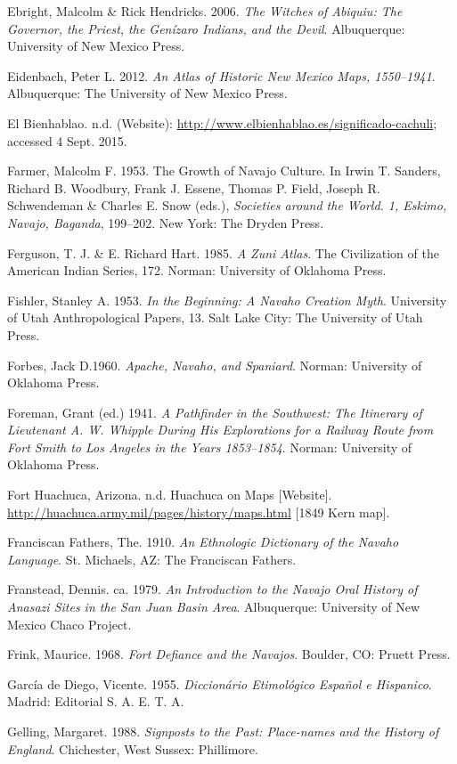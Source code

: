 Ebright, Malcolm \& Rick Hendricks. 2006. \textit{The Witches of Abiquiu: The Governor, the Priest, the Genízaro Indians, and the Devil}.  Albuquerque:  University of New Mexico Press.

Eidenbach, Peter L.  2012.  \textit{An Atlas of Historic New Mexico Maps, 1550--1941}.  Albuquerque:  The University of New Mexico Press.

El Bienhablao. n.d.  (Website): \url{http://www.elbienhablao.es/significado-cachuli}; accessed 4 Sept. 2015.

Farmer, Malcolm F.  1953.  The Growth of Navajo Culture.  In  Irwin T. Sanders, Richard B. Woodbury, Frank J. Essene, Thomas P. Field, Joseph R. Schwendeman \& Charles E. Snow (eds.), \textit{Societies around the World.  1, Eskimo, Navajo, Baganda},   199--202.  New York:  The Dryden Press.

Ferguson, T. J. \& E. Richard Hart. 1985. \textit{A Zuni Atlas}.  The Civilization of the American Indian Series, 172.  Norman:  University of Oklahoma Press.

Fishler, Stanley A.  1953. \textit{In the Beginning: A Navaho Creation Myth}.  University of Utah Anthropological Papers, 13.  Salt Lake City:  The University of Utah Press.

Forbes, Jack D.1960.  \textit{Apache, Navaho, and Spaniard}.  Norman:  University of Oklahoma Press.

Foreman, Grant (ed.)  1941. \textit{A Pathfinder in the Southwest: The Itinerary of Lieutenant A. W. Whipple During His Explorations for a Railway Route from Fort Smith to Los Angeles in the Years 1853--1854}.  Norman:  University of Oklahoma Press.

Fort Huachuca, Arizona. n.d.  Huachuca on Maps [Website]. \url{http://huachuca.army.mil/pages/history/maps.html} [1849 Kern map].

Franciscan Fathers, The. 1910. \textit{An Ethnologic Dictionary of the Navaho Language}.  St. Michaels, AZ:  The Franciscan Fathers.

Franstead, Dennis. ca. 1979. \textit{An Introduction to the Navajo Oral History of Anasazi Sites in the San Juan Basin Area}.  Albuquerque:  University of New Mexico Chaco Project.

Frink, Maurice. 1968. \textit{Fort Defiance and the Navajos}.  Boulder, CO:  Pruett Press.

García de Diego, Vicente. 1955. \textit{Diccionário Etimológico Español e Hispanico}.  Madrid:  Editorial S. A. E. T. A.

Gelling, Margaret. 1988. \textit{Signposts to the Past: Place-names and the History of England}.  Chichester, West Sussex:  Phillimore.

